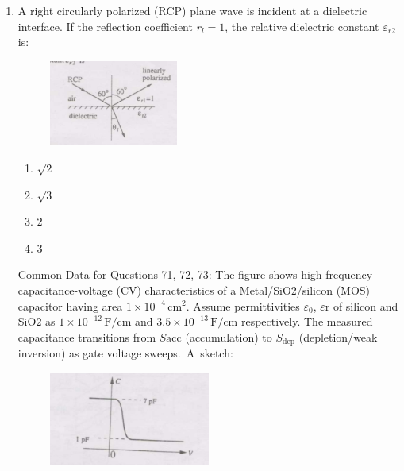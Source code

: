 \documentclass[journal,12pt,onecolumn]{IEEEtran}
\theoremstyle{remark}
\begin{document}
\begin{enumerate}
\begin{multicols}{4}
\begin{enumerate}
  \item A
  \item B
  \item C
  \item D
\end{enumerate}
\end{multicols}

\item A right circularly polarized (RCP) plane wave is incident at a dielectric interface. If the reflection coefficient $r_{l}=1$, the relative dielectric constant $\varepsilon_{r2}$ is:
\begin{figure}[ht!]
    \centering
    \includegraphics[width=0.4\textwidth]{Q70.jpg}
    \caption{}
    \label{fig:Q70.jpg}
\end{figure}

\hfill{}

\begin{multicols}{4}
\begin{enumerate}
  \item $\sqrt{2}$
  \item $\sqrt{3}$
  \item $2$
  \item $3$
\end{enumerate}
\end{multicols}

{Common Data for Questions 71, 72, 73:} 
The figure shows high-frequency capacitance-voltage (CV) characteristics of a Metal/SiO$2$/silicon (MOS) capacitor having area $1\times10^{-4}\,\text{cm}^2$. Assume permittivities $\varepsilon_0$, $\varepsilon{\text{r}}$ of silicon and SiO$2$ as $1\times 10^{-12}\,\text{F/cm}$ and $3.5\times10^{-13}\,\text{F/cm}$ respectively. The measured capacitance transitions from $S\text{acc}$ (accumulation) to $S_\text{dep}$ (depletion/weak inversion) as gate voltage sweeps. A sketch:

\begin{figure}[ht!]
    \centering
    \includegraphics[width=0.5\textwidth]{Q71Q72Q73.jpg}
    \caption{}
    \label{fig:Q71Q72@73.jpg}
\end{figure}


\end{enumerate}
\end{document}
